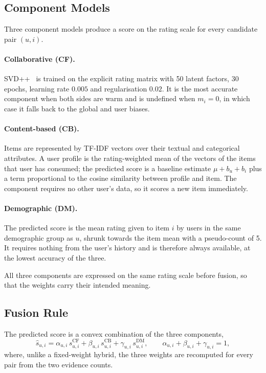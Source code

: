 \documentclass[runningheads]{llncs}
\begin{document}
\subsection{Component Models}

Three component models produce a score on the rating scale for every candidate pair $(u,i)$.

\paragraph{Collaborative (CF).} SVD++~\cite{koren2008} is trained on the explicit rating matrix with 50 latent factors, 30 epochs, learning rate $0.005$ and regularisation $0.02$. It is the most accurate component when both sides are warm and is undefined when $m_i = 0$, in which case it falls back to the global and user biases.

\paragraph{Content-based (CB).} Items are represented by TF-IDF vectors over their textual and categorical attributes. A user profile is the rating-weighted mean of the vectors of the items that user has consumed; the predicted score is a baseline estimate $\mu + b_u + b_i$ plus a term proportional to the cosine similarity between profile and item. The component requires no other user's data, so it scores a new item immediately.

\paragraph{Demographic (DM).} The predicted score is the mean rating given to item $i$ by users in the same demographic group as $u$, shrunk towards the item mean with a pseudo-count of 5. It requires nothing from the user's history and is therefore always available, at the lowest accuracy of the three.

All three components are expressed on the same rating scale before fusion, so that the weights carry their intended meaning.

\subsection{Fusion Rule}

The predicted score is a convex combination of the three components,
\begin{equation}
  \hat{s}_{u,i} = \alpha_{u,i}\, s^{\mathrm{CF}}_{u,i} + \beta_{u,i}\, s^{\mathrm{CB}}_{u,i} + \gamma_{u,i}\, s^{\mathrm{DM}}_{u,i},
  \qquad \alpha_{u,i} + \beta_{u,i} + \gamma_{u,i} = 1,
  \label{eq:fusion}
\end{equation}
where, unlike a fixed-weight hybrid, the three weights are recomputed for every pair from the two evidence counts.
\end{document}
